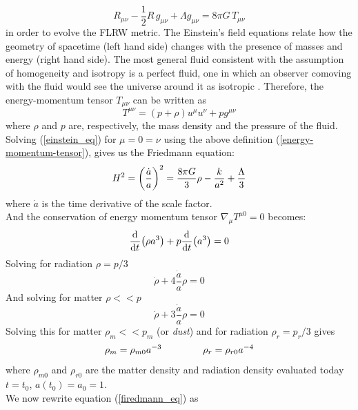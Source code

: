 \documentclass{article}
\newcommand{\beq}{\begin{equation}}
\newcommand{\eeq}{\end{equation}}
\begin{document}
\begin{equation}
\label{einstein_eq}
R_{\mu \nu} - \dfrac{1}{2} R \, g _{\mu \nu} + \Lambda g_{\mu \nu}= 8 \pi G \, T_{\mu \nu}
\end{equation}
in order to evolve the FLRW metric.
The Einstein's field equations relate how the geometry of spacetime (left hand side) changes with the presence of masses and energy (right hand side).
The most general fluid consistent with the assumption of homogeneity and isotropy is a perfect fluid, one in which an observer comoving with the fluid would see the universe around it as isotropic \citep{garcia-bellidoAstrophysicsCosmology2000}. Therefore, the energy-momentum tensor $T_{\mu \nu}$ can be written as
\begin{equation}
\label{energy-momentum-tensor}
T^{\mu \nu } = (p + \rho)u ^{\mu} u^{\nu}+p g^{\mu \nu} 
\end{equation}
where $\rho$ and $p$ are, respectively, the mass density and the pressure of the fluid.\\
Solving (\ref{einstein_eq}) for $\mu= 0=\nu$ using the above definition (\ref{energy-momentum-tensor}), gives us the Friedmann equation:
\begin{equation}
\label{firedmann_eq}
\begin{split}
H^2 = \qty(\frac{\dot{a}}{a})^2 = \dfrac{8 \pi G}{3} \rho -\dfrac{k}{a^2} + \frac{\Lambda}{3}
\end{split}
\end{equation}
where $\dot{a}$ is the time derivative of the scale factor.\\
And the conservation of energy momentum tensor $\nabla_\mu T^{\mu 0} =0 $ becomes:
\beq
\label{energy_cons}
\dv[]{}{t}\qty(\rho a^3) + p \dv[]{}{t} \qty(a^3)  = 0
\eeq
Solving for radiation $\rho = p/3$
\[
\dot{\rho}  + 4 \frac{ \dot{a}}{a} \rho =0
\]
 And solving for matter $\rho << p$
 \[
 \dot{\rho}  + 3 \frac{ \dot{a}}{a} \rho =0
 \]
Solving this for matter $\rho_m << p_m$ (or \emph{dust}) and for radiation $\rho_r = p_r/3$ gives
\begin{equation}
\begin{split}
\rho_m = \rho_{m 0} a^{-3} \hspace{1.5cm} \rho_r = \rho_{r 0} a^{-4} \notag
\end{split}
\end{equation}
where $\rho_{m 0}$ and $\rho_{r 0}$ are the matter density and radiation density evaluated today $t = t_0$, $a(t_0) = a_0 =1$.\\
We now rewrite equation (\ref{firedmann_eq}) as
\end{document}
